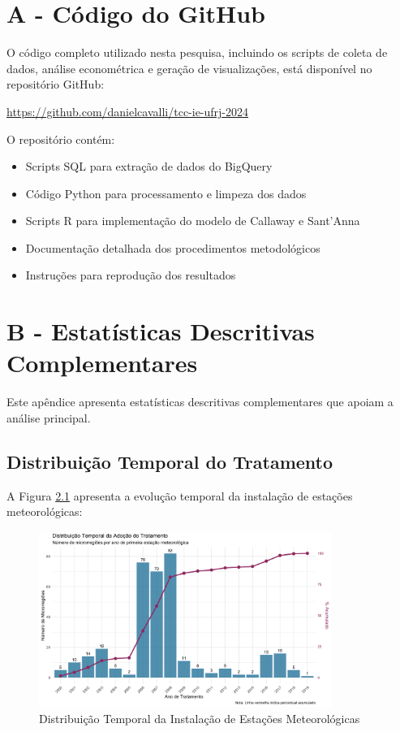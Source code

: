 \documentclass[
	12pt,				%
	oneside,			%
	a4paper,			%
	english,			%
	french,				%
	spanish,			%
	brazil				%
	]{abntex2}
\begin{document}
\begin{apendicesenv}

\partapendices

\chapter{A - Código do GitHub}

O código completo utilizado nesta pesquisa, incluindo os scripts de coleta de dados, análise econométrica e geração de visualizações, está disponível no repositório GitHub:

\url{https://github.com/danielcavalli/tcc-ie-ufrj-2024}

O repositório contém:
\begin{itemize}
\item Scripts SQL para extração de dados do BigQuery
\item Código Python para processamento e limpeza dos dados
\item Scripts R para implementação do modelo de Callaway e Sant'Anna
\item Documentação detalhada dos procedimentos metodológicos
\item Instruções para reprodução dos resultados
\end{itemize}

\chapter{B - Estatísticas Descritivas Complementares}

Este apêndice apresenta estatísticas descritivas complementares que apoiam a análise principal.

\section{Distribuição Temporal do Tratamento}

A Figura \ref{fig:dist_temporal} apresenta a evolução temporal da instalação de estações meteorológicas:

\begin{figure}[h]
\centering
\caption{Distribuição Temporal da Instalação de Estações Meteorológicas}
\label{fig:dist_temporal}
\includegraphics[width=0.85\textwidth]{../../../data/outputs/descriptive_analysis/distribuicao_temporal_tratamento.png}


\end{figure}
\end{apendicesenv}
\end{document}
